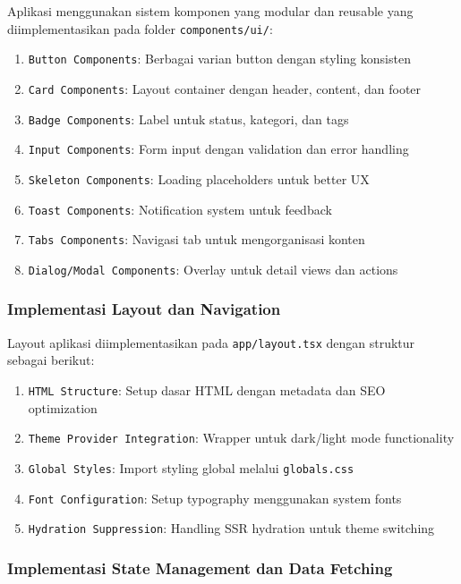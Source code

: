Aplikasi menggunakan sistem komponen yang modular dan reusable yang diimplementasikan pada folder \texttt{components/ui/}:

\begin{enumerate}
	\item \texttt{Button Components}: Berbagai varian button dengan styling konsisten
	\item \texttt{Card Components}: Layout container dengan header, content, dan footer
	\item \texttt{Badge Components}: Label untuk status, kategori, dan tags
	\item \texttt{Input Components}: Form input dengan validation dan error handling
	\item \texttt{Skeleton Components}: Loading placeholders untuk better UX
	\item \texttt{Toast Components}: Notification system untuk feedback
	\item \texttt{Tabs Components}: Navigasi tab untuk mengorganisasi konten
	\item \texttt{Dialog/Modal Components}: Overlay untuk detail views dan actions
\end{enumerate}

\subsubsection{Implementasi Layout dan Navigation}

Layout aplikasi diimplementasikan pada \texttt{app/layout.tsx} dengan struktur sebagai berikut:

\begin{enumerate}
	\item \texttt{HTML Structure}: Setup dasar HTML dengan metadata dan SEO optimization
	\item \texttt{Theme Provider Integration}: Wrapper untuk dark/light mode functionality
	\item \texttt{Global Styles}: Import styling global melalui \texttt{globals.css}
	\item \texttt{Font Configuration}: Setup typography menggunakan system fonts
	\item \texttt{Hydration Suppression}: Handling SSR hydration untuk theme switching
\end{enumerate}

\subsubsection{Implementasi State Management dan Data Fetching}

